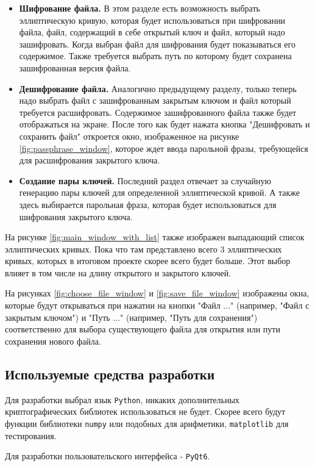 \begin{itemize}
	\item \textbf{Шифрование файла.} В этом разделе есть возможность выбрать эллиптическую кривую, которая будет использоваться при шифровании файла, файл, содержащий в себе открытый ключ и файл, который надо зашифровать. Когда выбран файл для шифрования будет показываться его содержимое. Также требуется выбрать путь по которому будет сохранена зашифрованная версия файла.
	\item \textbf{Дешифрование файла.} Аналогично предыдущему разделу, только теперь надо выбрать файл с зашифрованным закрытым ключом и файл который требуется расшифровать. Содержимое зашифрованного файла также будет отображаться на экране. После того как будет нажата кнопка "Дешифровать и сохранить файл" откроется окно, изображенное на рисунке \ref{fig:passphrase_window}, которое ждет ввода парольной фразы, требующейся для расшифрования закрытого ключа.
	\item \textbf{Создание пары ключей.} Последний раздел отвечает за случайную генерацию пары ключей для определенной эллиптической кривой. А также здесь выбирается парольная фраза, которая будет использоваться для шифрования закрытого ключа.
\end{itemize}

На рисунке \ref{fig:main_window_with_list} также изображен выпадающий список эллиптических кривых. Пока что там представлено всего 3 эллиптических кривых, которых в итоговом проекте скорее всего будет больше. Этот выбор влияет в том числе на длину открытого и закрытого ключей.

На рисунках \ref{fig:choose_file_window} и \ref{fig:save_file_window} изображены окна, которые будут открываться при нажатии на кнопки "Файл ..." (например, "Файл с закрытым ключом") и "Путь ..." (например, "Путь для сохранения") соответственно для выбора существующего файла для открытия или пути сохранения нового файла.

\subsection{Используемые средства разработки}

Для разработки выбрал язык \texttt{Python}, никаких дополнительных криптографических библиотек использоваться не будет. Скорее всего будут функции библиотеки \texttt{numpy} или подобных для арифметики, \texttt{matplotlib} для тестирования.

Для разработки пользовательского интерфейса - \texttt{PyQt6}.

